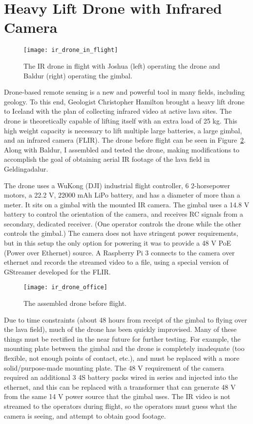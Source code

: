 \section{Heavy Lift Drone with Infrared Camera}
\label{section:ir_drone}

\begin{figure}
    \centering
    \texttt{[image: ir\_drone\_in\_flight]}
    \caption{The IR drone in flight with Joshua (left) operating the drone and Baldur (right) operating the gimbal.}
    \label{figure:ir_drone_in_flight}
\end{figure}

Drone-based remote sensing is a new and powerful tool in many fields, including geology.
To this end, Geologist Christopher Hamilton brought a heavy lift drone to Iceland
with the plan of collecting infrared video at active lava sites.
The drone is theoretically capable of lifting itself with an extra load of 25 kg.
This high weight capacity is necessary to lift multiple large batteries,
a large gimbal,
and an infrared camera (FLIR).
The drone before flight can be seen in Figure~\ref{figure:ir_drone_office}.
Along with Baldur, I assembled and tested the drone, making modifications to accomplish the goal of obtaining
aerial IR footage of the lava field in Geldingadalur.

The drone uses a WuKong (DJI) industrial flight controller,
6 2-horsepower motors,
a 22.2 V, 22000 mAh LiPo battery,
and has a diameter of more than a meter.
It sits on a gimbal with the mounted IR camera.
The gimbal uses a 14.8 V battery to control the orientation of the camera,
and receives RC signals from a secondary, dedicated receiver.
(One operator controls the drone while the other controls the gimbal.)
The camera does not have stringent power requirements,
but in this setup the only option for powering it was to provide
a 48 V PoE (Power over Ethernet) source.
A Raspberry Pi 3 connects to the camera over ethernet and records the streamed
video to a file, using a special version of GStreamer developed for the FLIR.

\begin{figure}
    \centering
    \texttt{[image: ir\_drone\_office]}
    \caption{The assembled drone before flight.}
    \label{figure:ir_drone_office}
\end{figure}

Due to time constraints (about 48 hours from receipt of the gimbal
to flying over the lava field),
much of the drone has been quickly improvised.
Many of these things must be rectified in the near future for further testing.
For example, the mounting plate between the gimbal and the drone
is completely inadequate (too flexible, not enough points of contact, etc.),
and must be replaced with a more solid/purpose-made mounting plate.
The 48 V requirement of the camera required an additional 3 4S battery packs
wired in series and injected into the ethernet,
and this can be replaced with a transformer that can generate 48 V
from the same 14 V power source that the gimbal uses.
The IR video is not streamed to the operators during flight,
so the operators must guess what the camera is seeing, and attempt to obtain good footage.

